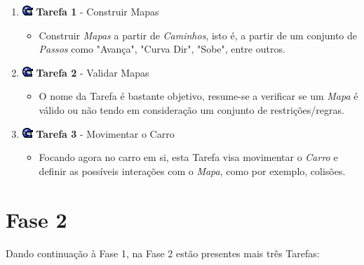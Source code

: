 \documentclass[12pt,a4paper]{report}
\begin{document}
\begin{enumerate}
 \item[]\includegraphics[scale=0.7]{p1.png}  \textbf{Tarefa 1} - Construir Mapas  

   \begin{itemize}
   \item Construir \textit{Mapas} a partir de \textit{Caminhos}, isto é, a partir de um conjunto de \textit{Passos} como "Avança", "Curva Dir", "Sobe", entre outros.
   \end{itemize}

 \item[]\includegraphics[scale=0.7]{p1.png}  \textbf{Tarefa 2} - Validar Mapas

   \begin{itemize}
   \item O nome da Tarefa é bastante objetivo, resume-se a verificar se um \textit{Mapa} é válido ou não tendo em consideração um conjunto de restrições/regras.
   \end{itemize}
   
 \item[]\includegraphics[scale=0.7]{p1.png}  \textbf{Tarefa 3} - Movimentar o Carro

    \begin{itemize}
    \item Focando agora no carro em si, esta Tarefa visa movimentar o \textit{Carro} e definir as possíveis interações com o \textit{Mapa}, como por exemplo, colisões.
    \end{itemize}
    
\end{enumerate}

\newpage
\section{Fase 2}
\label{sec:analisefase2}
\paragraph{}Dando continuação à Fase 1, na Fase 2 estão presentes mais três Tarefas:
\end{document}
